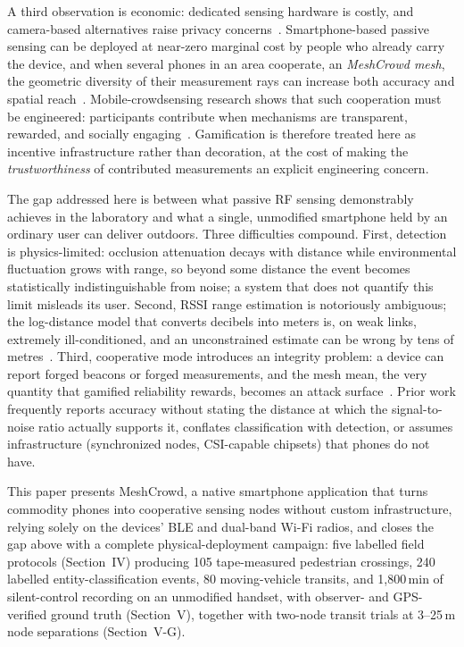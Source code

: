 \documentclass[journal,10pt]{IEEEtran}
\begin{document}
A third observation is economic: dedicated sensing hardware is costly, and
camera-based alternatives raise privacy concerns~\cite{khan2023,zhou2020}.
Smartphone-based passive sensing can be deployed at near-zero marginal cost
by people who already carry the device, and when several phones in an area
cooperate, an \emph{MeshCrowd mesh}, the geometric diversity of
their measurement rays can increase both accuracy and spatial
reach~\cite{li2024}. Mobile-crowdsensing research shows that such
cooperation must be engineered: participants contribute when mechanisms are
transparent, rewarded, and socially engaging~\cite{zhang2022,wang2018}.
Gamification is therefore treated here as incentive infrastructure rather
than decoration, at the cost of making the \emph{trustworthiness} of
contributed measurements an explicit engineering concern.

The gap addressed here is between what passive RF sensing demonstrably
achieves in the laboratory and what a single, unmodified smartphone held by
an ordinary user can deliver outdoors. Three difficulties compound.
First, detection is physics-limited: occlusion attenuation decays with
distance while environmental fluctuation grows with range, so beyond some
distance the event becomes statistically indistinguishable from noise; a
system that does not quantify this limit misleads its user. Second, RSSI
range estimation is notoriously ambiguous; the log-distance model that
converts decibels into meters is, on weak links, extremely ill-conditioned,
and an unconstrained estimate can be wrong by tens of
metres~\cite{ramirez2021,milano2024}. Third, cooperative mode introduces an
integrity problem: a device can report forged beacons or forged
measurements, and the mesh mean, the very quantity that gamified
reliability rewards, becomes an attack
surface~\cite{casar2022,antonioli2020}. Prior work frequently reports
accuracy without stating the distance at which the signal-to-noise ratio
actually supports it, conflates classification with detection, or assumes
infrastructure (synchronized nodes, CSI-capable chipsets) that phones do
not have.

This paper presents MeshCrowd, a native smartphone application that turns
commodity phones into cooperative sensing nodes without custom
infrastructure, relying solely on the devices' BLE and dual-band Wi-Fi
radios, and closes the gap above with a complete physical-deployment
campaign: five labelled field protocols (Section~IV) producing 105
tape-measured pedestrian crossings, 240 labelled entity-classification events, 80
moving-vehicle transits, and 1{,}800\,min of silent-control recording on an
unmodified handset, with observer- and GPS-verified ground truth
(Section~V), together with two-node transit trials at 3--25\,m node
separations (Section~V-G).
\end{document}
